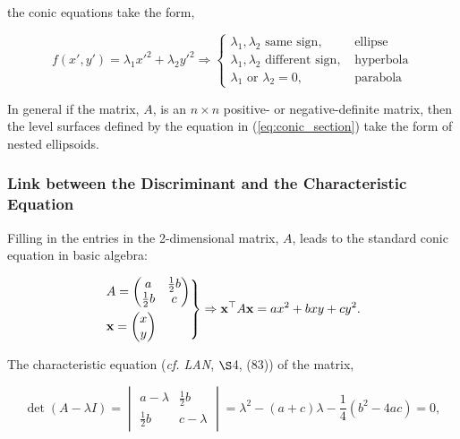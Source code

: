\documentclass[12pt, twoside, draft]{article}
\begin{document}
the conic equations take the form,

\begin{equation}\label{eq:eigenvalue_conic_conditions}
f(x', y') = \lambda_1 x'^2 + \lambda_2 y'^2 \Rightarrow \begin{cases} \lambda_1, \lambda_2 \text{ same sign,}  &\text{ ellipse} \\ 
\lambda_1, \lambda_2 \text{ different sign,} &\text{ hyperbola} \\
\lambda_1 \text{ or } \lambda_2 = 0, &\text{ parabola} \end{cases}
\end{equation}

In general if the matrix, $A$, is an $n \times n$ positive- or negative-definite matrix, then the level surfaces defined by the equation in (\ref{eq:conic_section}) take the form of nested ellipsoids.

\subsubsection{Link between the Discriminant and the Characteristic Equation}\label{sec:discriminant_characteristic_equation}
Filling in the entries in the 2-dimensional matrix, $A$, leads to the standard conic equation in basic algebra:

\begin{equation}\label{eq:conic_equation}
\begin{rcases} A= \begin{pmatrix} a & \frac{1}{2}b \\ \frac{1}{2}b & c \end{pmatrix} \\ 
\mathbf{x} = \begin{pmatrix} x \\ y \end{pmatrix} \end{rcases} \Rightarrow 
\mathbf{x}^\top A \mathbf{x} = ax^2 + bxy + cy^2.
\end{equation}

The characteristic equation (\textit{cf. LAN}, $\S$4, (83)) of the matrix,

\begin{equation}
\det(A - \lambda I) = \begin{vmatrix} a - \lambda & \frac{1}{2}b \\ \frac{1}{2}b & c - \lambda \end{vmatrix} = \lambda^2 - (a+c) \lambda - \frac{1}{4}(b^2 - 4ac) = 0,
\end{equation}
\end{document}

